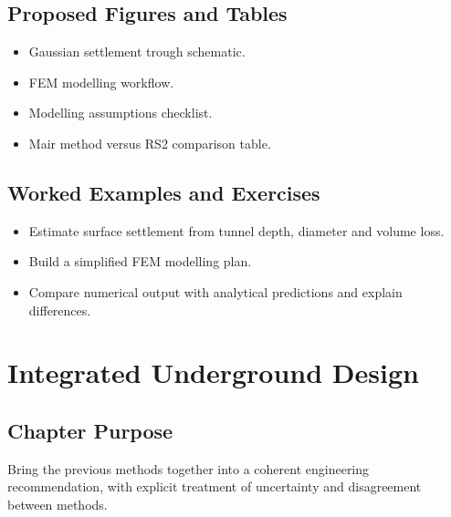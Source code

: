 \documentclass[12pt,oneside]{book}
\begin{document}
\section{Proposed Figures and Tables}
\begin{itemize}
    \item Gaussian settlement trough schematic.
    \item FEM modelling workflow.
    \item Modelling assumptions checklist.
    \item Mair method versus RS2 comparison table.
\end{itemize}

\section{Worked Examples and Exercises}
\begin{itemize}
    \item Estimate surface settlement from tunnel depth, diameter and volume loss.
    \item Build a simplified FEM modelling plan.
    \item Compare numerical output with analytical predictions and explain differences.
\end{itemize}

\chapter{Integrated Underground Design}

\section{Chapter Purpose}
Bring the previous methods together into a coherent engineering recommendation, with explicit treatment of uncertainty and disagreement between methods.
\end{document}

